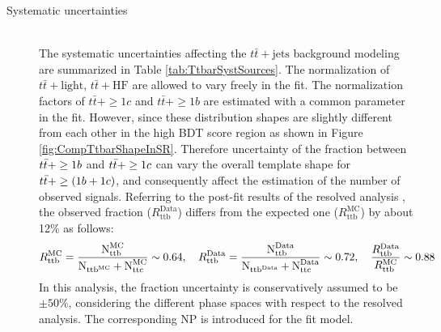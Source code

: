 \begin{description}
  \item[Systematic uncertainties] \mbox{}\\
    The systematic uncertainties affecting the $t\bar{t}+\text{jets}$ background modeling are summarized in Table \ref{tab:TtbarSystSources}. 
    The normalization of $t\bar{t}+\text{light}$, $t\bar{t}+\text{HF}$ are allowed to vary freely in the fit. The normalization factors of $t\bar{t}+\geq1c$ and $t\bar{t}+\geq1b$ are estimated with a common parameter in the fit. However, since these distribution shapes are slightly different from each other in the high BDT score region as shown in Figure \ref{fig:CompTtbarShapeInSR}. Therefore uncertainty of the fraction between $t\Bar{t}+ \geq 1b$ and $t\Bar{t}+ \geq 1c$ can vary the overall template shape for $t\Bar{t}+ \geq (1b + 1c)$, and consequently affect the estimation of the number of observed signals. Referring to the post-fit results of the resolved analysis \cite{HDBS-2021-02}, the observed fraction ($R_{\text{ttb}}^{\text{Data}}$) differs from the expected one ($R_{\text{ttb}}^{\text{MC}}$) by about 12\% as follows:
    \begin{alignat}{1}
        R_{\text{ttb}}^{\text{MC}} = \frac{\text{N}_{\text{ttb}}^{\text{MC}}}{\text{N}_{\text{ttb}^{\text{MC}}} + \text{N}_{\text{ttc}}^{\text{MC}}} \sim 0.64,
        \quad R_{\text{ttb}}^{\text{Data}} = \frac{\text{N}_{\text{ttb}}^{\text{Data}}}{\text{N}_{\text{ttb}^{\text{Data}}} + \text{N}_{\text{ttc}}^{\text{Data}}} & \sim 0.72,
        \quad \frac{R_{\text{ttb}}^{\text{Data}}}{R_{\text{ttb}}^{\text{MC}}} \sim 0.88 \notag
    \end{alignat}
    In this analysis, the fraction uncertainty is conservatively assumed to be $\pm 50\%$, considering the different phase spaces with respect to the resolved analysis. The corresponding NP is introduced for the fit model.


\end{description}
